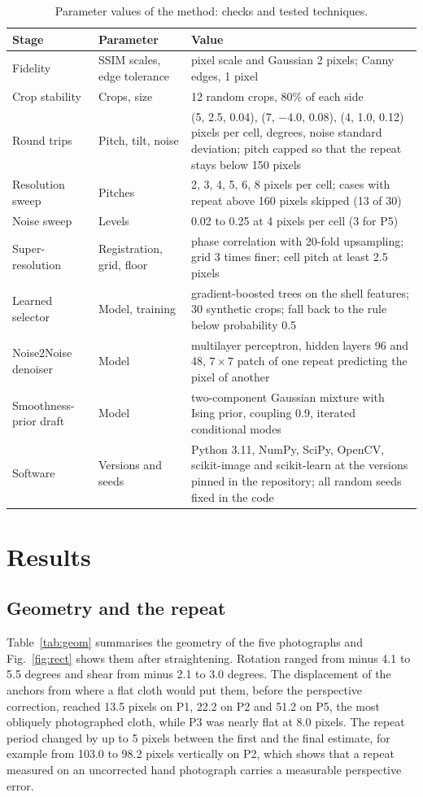 \documentclass[12pt]{article}
\begin{document}
\begin{table}[htbp]
\caption{Parameter values of the method: checks and tested techniques.}
\label{tab:params2}
\footnotesize
\begin{tabular}{L{4.0cm}L{5.4cm}L{5.2cm}}
Stage & Parameter & Value \\ \midrule
Fidelity & SSIM scales, edge tolerance & pixel scale and Gaussian 2 pixels; Canny edges, 1 pixel \\
Crop stability & Crops, size & 12 random crops, 80\% of each side \\
Round trips & Pitch, tilt, noise & (5, 2.5, 0.04), (7, $-4.0$, 0.08), (4, 1.0, 0.12) pixels per cell, degrees, noise standard deviation; pitch capped so that the repeat stays below 150 pixels \\
Resolution sweep & Pitches & 2, 3, 4, 5, 6, 8 pixels per cell; cases with repeat above 160 pixels skipped (13 of 30) \\
Noise sweep & Levels & 0.02 to 0.25 at 4 pixels per cell (3 for P5) \\
Super-resolution & Registration, grid, floor & phase correlation with 20-fold upsampling; grid 3 times finer; cell pitch at least 2.5 pixels \\
Learned selector & Model, training & gradient-boosted trees on the shell features; 30 synthetic crops; fall back to the rule below probability 0.5 \\
Noise2Noise denoiser & Model & multilayer perceptron, hidden layers 96 and 48, $7\times7$ patch of one repeat predicting the pixel of another \\
Smoothness-prior draft & Model & two-component Gaussian mixture with Ising prior, coupling 0.9, iterated conditional modes \\
Software & Versions and seeds & Python 3.11, NumPy, SciPy, OpenCV, scikit-image and scikit-learn at the versions pinned in the repository; all random seeds fixed in the code \\
\end{tabular}
\end{table}
\section{Results}

\subsection{Geometry and the repeat}

Table~\ref{tab:geom} summarises the geometry of the five photographs and Fig.~\ref{fig:rect} shows them after straightening. Rotation ranged from minus 4.1 to 5.5 degrees and shear from minus 2.1 to 3.0 degrees. The displacement of the anchors from where a flat cloth would put them, before the perspective correction, reached 13.5 pixels on P1, 22.2 on P2 and 51.2 on P5, the most obliquely photographed cloth, while P3 was nearly flat at 8.0 pixels. The repeat period changed by up to 5 pixels between the first and the final estimate, for example from 103.0 to 98.2 pixels vertically on P2, which shows that a repeat measured on an uncorrected hand photograph carries a measurable perspective error.
\end{document}
